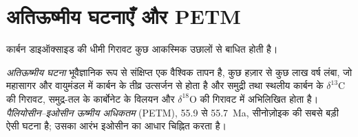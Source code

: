 \section{अतिऊष्मीय घटनाएँ और PETM}\label{sec:b2:deep-time-climate:petm}

कार्बन डाइऑक्साइड की धीमी गिरावट कुछ आकस्मिक उछालों से बाधित होती है।

\begin{definition}\label{def:b2:deep-time-climate:petm}
\emph{अतिऊष्मीय घटना} भूवैज्ञानिक रूप से संक्षिप्त एक वैश्विक तापन है, कुछ
हज़ार से कुछ लाख वर्ष लंबा, जो महासागर और वायुमंडल में कार्बन के तीव्र उत्सर्जन से होता है और
समुद्री तथा स्थलीय कार्बन के $\delta^{13}$C की गिरावट, समुद्र-तल के कार्बोनेट के विलयन और $\delta^{18}$O
की गिरावट में अभिलिखित होता है। \emph{पैलियोसीन--इओसीन ऊष्मीय
अधिकतम} (PETM), 55.9 से \qty{55.7}{Ma}, सीनोज़ोइक की
सबसे बड़ी ऐसी घटना है; उसका आरंभ इओसीन का आधार चिह्नित करता है।
\end{definition}

